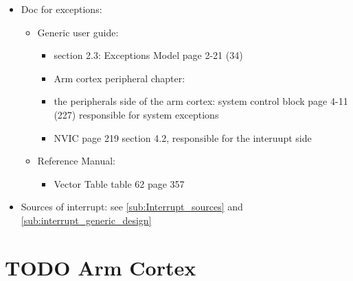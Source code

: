 \begin{itemize}
\begin{itemize}
\begin{enumerate}
	\end{enumerate}		
	
	\end{itemize}


\item Doc for exceptions:

	\begin{itemize}
	\item Generic user guide:
	
		\begin{itemize}
		\item section 2.3: Exceptions Model page 2-21 (34)
		
		\item Arm cortex peripheral chapter: 		
		
		\item the peripherals side of the arm cortex: system control block page 4-11 (227) responsible for system exceptions
		
		\item NVIC page 219 section 4.2, responsible for the interuupt side
		\end{itemize}				
	
	\item Reference Manual:
		
	\begin{itemize}
	\item Vector Table table 62 page 357 	
	\end{itemize}		
	
	\end{itemize}
   
\item Sources of interrupt: see \ref{sub:Interrupt_sources} and \ref{sub:interrupt_generic_design}   
   
\end{itemize}

\newpage
\section{TODO Arm Cortex}

